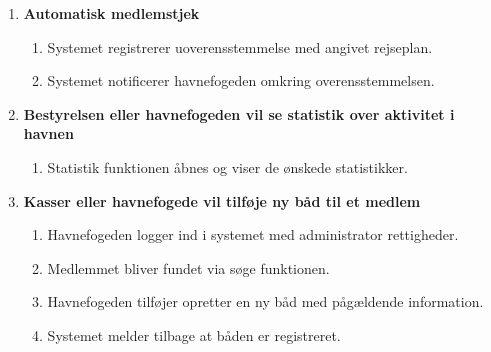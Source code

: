 \begin{enumerate}
    \item{\bf{Automatisk medlemstjek}}
      \begin{enumerate}
        \item Systemet registrerer uoverensstemmelse med angivet rejseplan.
        \item Systemet notificerer havnefogeden omkring overensstemmelsen.
      \end{enumerate}

    \item{\bf{Bestyrelsen eller havnefogeden vil se statistik over aktivitet i havnen}}
      \begin{enumerate}
        \item Statistik funktionen åbnes og viser de ønskede statistikker.
      \end{enumerate}
	  
	\item{\bf{Kasser eller havnefogede vil tilføje ny båd til et medlem}}
	  \begin{enumerate}
		\item Havnefogeden logger ind i systemet med administrator rettigheder.
		\item Medlemmet bliver fundet via søge funktionen.
		\item Havnefogeden tilføjer opretter en ny båd med pågældende information.
		\item Systemet melder tilbage at båden er registreret.
	   \end{enumerate}
		

  \end{enumerate}

